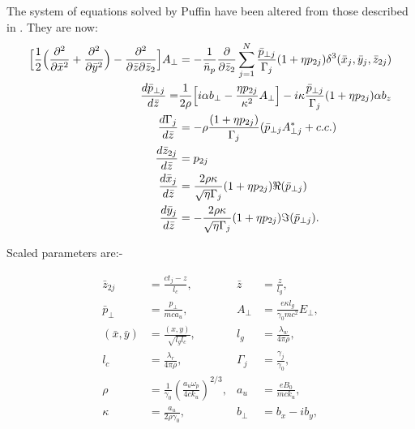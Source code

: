 \documentclass[12pt]{article}%
\begin{document}
The system of equations solved by Puffin have been altered from those described in \cite{puffin}. They are now:
\begin{align}
\Bigl[\frac{1}{2}\Bigl(\frac{\partial^2}{\partial\bar{x}^2} + \frac{\partial^2}{\partial\bar{y}^2}\Bigr) -  \frac{\partial^2}{\partial\bar{z}\partial\bar{z}_2}\Bigr]A_{\bot}  & = -\frac{1}{\bar{n}_p}\frac{\partial}{\partial \bar{z}_2}\sum_{j=1}^{N} \frac{\bar{p}_{\bot j}}{\Gamma_j} (1+\eta p_{2j})     \delta^3(\bar{x}_j,\bar{y}_j,\bar{z}_{2j})  \label{fieldeq2} \\
\frac{d \bar{p}_{\bot j}}{d \bar{z}} = & \frac{1}{2\rho}\Bigl[ i \alpha b_{\bot} - \frac{\eta p_{2j}}{\kappa^2}A_{\bot} \Bigr] - i\kappa \frac{ \bar{p}_{\bot j}}{\Gamma_j} (1 + \eta p_{2j})  \alpha b_z \label{pperpeqn2} \\
\frac{d \Gamma_{j}}{d \bar{z}} &= - \rho \frac{(1 + \eta p_{2j})}{\Gamma_j} (\bar{p}_{\bot j} A^*_{\bot j} + c.c.)  \label{gameqn} \\
\frac{d\bar{z}_{2j}}{d\bar{z}}& = p_{2j}  \label{z2eqgen2} \\
\frac{d\bar{x}_j}{d\bar{z}} &=  \frac{2 \rho \kappa}{\sqrt{\eta} \Gamma_j} (1 + \eta p_{2j}) \Re(\bar{p}_{\bot j}) \label{xeqgen2} \\
\frac{d\bar{y}_j}{d\bar{z}} &= - \frac{2 \rho \kappa}{\sqrt{\eta} \Gamma_j}  (1 + \eta p_{2j}) \Im(\bar{p}_{\bot j}). \label{yeqgen2}
\end{align}



Scaled parameters are:-






\begin{align}
\bar{z}_{2j} &= \frac{ct_j - z}{l_c}, &\bar{z} &= \frac{z}{l_g}, \nonumber \\
\bar{p}_{\bot} &= \frac{p_{\bot}}{mc a_u},
&A_{\bot}&=\frac{e \kappa l_g}{\gamma_0 mc^2 }E_{\bot}, \nonumber \\
(\bar{x},\bar{y}) &= \frac{(x,y)}{\sqrt{l_g l_c}}, &l_g &= \frac{\lambda_w}{4\pi\rho}, \nonumber \\
l_c &= \frac{\lambda_r}{4\pi\rho}, & \Gamma_j& = \frac{\gamma_j}{\gamma_0}, \nonumber \\
\rho &=\frac{1}{\gamma_0}\left(\frac{a_u \omega_p}{4ck_u}\right)^{2/3}, 
&a_u & =\frac{eB_0}{mck_u}, \nonumber \\
\kappa & = \frac{a_u}{2 \rho \gamma_0}, & b_{\bot} & = b_x - i b_y, \nonumber
\end{align}
\end{document}
